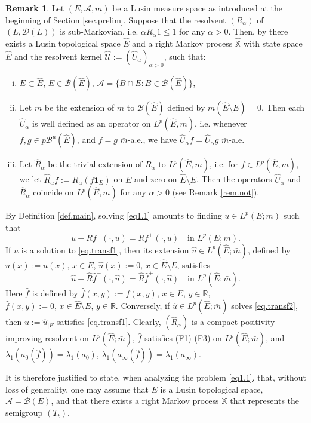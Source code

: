 \documentclass[11pt,a4paper,reqno]{amsart}
\theoremstyle{definition}
\newtheorem{remark}[theorem]{Remark}
\numberwithin{equation}{section}
\begin{document}
\begin{remark}
\label{rem.main}
Let $(E,\mathcal A,m)$ be a Lusin measure space as introduced at the beginning of Section \ref{sec.prelim}.
Suppose that  the resolvent $(R_\alpha)$ of $(L,\mathscr D(L))$ is sub-Markovian, i.e. $\alpha R_\alpha1\le 1$
for any $\alpha>0$. 
Then, by  \cite[Theorem 2.2]{BBR} there exists a   Lusin topological space 
$\hat E$ and  a right Markov process $\hat{\mathbb  X}$ with state space 
$\hat E$ and the  resolvent kernel  $\hat{\mathcal U}:= (\hat U_\alpha)_{\alpha>0}$, such that:
\begin{enumerate}[(i)]
\item  $E \subset \hat E$, 
$E\in \mathcal{B}(\hat E)$, $\mathcal A=\{B\cap E:B\in\mathcal B(\hat E)\}$, 
\item Let $\bar{m}$ be  the extension of $m$ to  $\mathcal{B}(\hat E)$ defined by $\bar m(\hat E\setminus E)=0$. 
Then each $\hat U_\alpha$ is well defined as an  operator  on  
$L^p(\hat E, \bar{m})$, i.e. 
whenever $f,g\in p\mathcal B^u(\hat E)$,  and $f=g$ $\bar{m}$-a.e., 
we have $\hat U_\alpha f=\hat U_\alpha g$ $\bar m$-a.e. 
\item Let $\hat R_\alpha$ be the trivial extension of $R_\alpha$ to $L^p(\hat E,\bar m)$, i.e.
for $f\in L^p(\hat E,\bar m)$, we let $\hat R_\alpha f:= R_\alpha (f\mathbf1_E)$ on $E$ and zero on 
$\hat E\setminus E$. Then the  operators  $\hat U_\alpha$ and $\hat R_\alpha$  
coincide on $L^p(\hat E,\bar m)$   for any $\alpha> 0$
(see Remark \ref{rem.not}).  
\end{enumerate}
By  Definition \ref{def.main}, solving \eqref{eq1.1} amounts to finding  $u\in L^p(E;m)$ such that 
\begin{equation}
\label{eq.transf1}
u+Rf^-(\cdot,u)=Rf^+(\cdot,u)\quad \text{in }L^p(E;m).
\end{equation}
If $u$ is a  solution to \eqref{eq.transf1}, then its extension 
$\hat u\in L^p(\hat E;\bar m)$, defined  by    $\hat u(x):= u(x),\, x\in E$,  $\hat u(x):=0,\, x\in \hat E\setminus E$, satisfies
\begin{equation}
\label{eq.transf2}
\hat u+\hat R\hat{f}^-(\cdot,\hat u)=\hat R\hat{f}^+(\cdot,\hat u)\quad \text{in }L^p(\hat E;\bar m).
\end{equation}
Here $\hat f$ is defined by $\hat f(x,y):= f(x,y),\, x\in E,\,y\in\mathbb R$, $\hat f(x,y):=0,\, x\in \hat E\setminus E,\,y\in\mathbb R$.
Conversely,  if  $\hat u\in L^p(\hat E;\bar m)$ solves \eqref{eq.transf2}, then  $u:= \hat u_{|E}$
satisfies \eqref{eq.transf1}. Clearly, $(\hat R_\alpha)$ is a compact  positivity-improving 
resolvent on $L^p(\hat E;\bar m)$,  $\hat f$ satisfies (F1)-(F3) on $L^p(\hat E;\bar m)$, 
and $\lambda_1(a_0(\hat f))=\lambda_1(a_0)$, $\lambda_1(a_\infty(\hat f))=\lambda_1(a_\infty)$.

It is therefore justified to state, when analyzing the problem \eqref{eq1.1},  that, without loss of generality, 
one may assume that  $E$ is a Lusin topological space, $\mathcal A=\mathcal B(E)$, and  that 
there exists a right Markov process 
$\mathbb X$  that represents  the semigroup $(T_t)$.
\end{remark}
\end{document}
